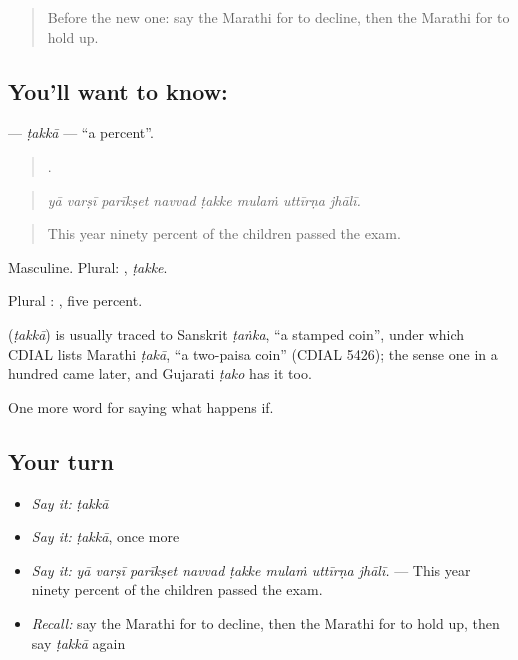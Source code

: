 \label{lesson:MR-C391-takka}



\begin{quote}
Before the new one: say the Marathi for to decline, then the Marathi for to hold up.
\end{quote}

\subsection*{You'll want to know: }
\textbf{} — \emph{ṭakkā} — \textquotedblleft{}a percent\textquotedblright{}.

\begin{quote}
       .
\end{quote}

\begin{quote}
\emph{yā varṣī parīkṣet navvad ṭakke mulaṁ uttīrṇa jhālī.}
\end{quote}

\begin{quote}
This year ninety percent of the children passed the exam.
\end{quote}

Masculine. Plural: , \emph{ṭakke}.

Plural :  , five percent.

\begin{cousinweb}
\textbf{} (\emph{ṭakkā}) is usually traced to Sanskrit \emph{ṭaṅka}, \textquotedblleft{}a stamped coin\textquotedblright{}, under which CDIAL lists Marathi \emph{ṭakā}, \textquotedblleft{}a two-paisa coin\textquotedblright{} (CDIAL 5426); the sense one in a hundred came later, and Gujarati \emph{ṭako} has it too.
\end{cousinweb}

\begin{grammarlens}[title={What you've built}]
One more word for saying what happens if.
\end{grammarlens}

\subsection*{Your turn}
\begin{itemize}
\raggedright
  \item \emph{Say it:} \emph{ṭakkā}
  \item \emph{Say it:} \emph{ṭakkā}, once more
  \item \emph{Say it:} \emph{yā varṣī parīkṣet navvad ṭakke mulaṁ uttīrṇa jhālī.} — This year ninety percent of the children passed the exam.
  \item \emph{Recall:} say the Marathi for to decline, then the Marathi for to hold up, then say \emph{ṭakkā} again
\end{itemize}

